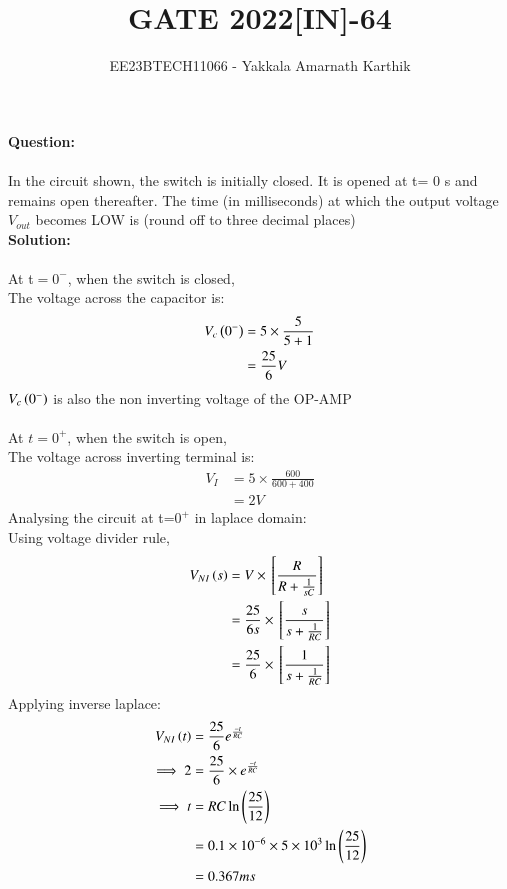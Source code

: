 \documentclass[journal,12pt,twocolumn]{IEEEtran}
\begin{document}


\title{GATE 2022[IN]-64}
\author{EE23BTECH11066 - Yakkala Amarnath Karthik}
\maketitle


\textbf{Question:}\\ \\
In the circuit shown, the switch is initially closed. It is opened at t= 0 s and
remains open thereafter. The time (in milliseconds) at which the output voltage
$V_{out}$ becomes LOW is  (round off to three decimal places)\\


\textbf{Solution:}\\ \\
At t$=0^-$, when the switch is closed,\\
The voltage across the capacitor is:
\begin{align}
V_c\left(0^-\right)&=5\times\frac{5}{5+1}\\
&=\frac{25}{6}V
\end{align}
$V_c\left(0^-\right)$ is also the non inverting voltage of the OP-AMP\\ \\
At $t=0^+$, when the switch is open,\\
The voltage across inverting terminal is:
\begin{align}
V_I&=5\times\frac{600}{600+400}\\
&=2V
\end{align}
Analysing the circuit at t=$0^+$ in laplace domain:\\ 

Using voltage divider rule,
\begin{align}
V_{NI}\left(s\right)&=V\times{}\left[\frac{R}{R+\frac{1}{sC}}\right]\\
    &=\frac{25}{6s}\times{}\left[\frac{s}{s+\frac{1}{RC}}\right]\\
    &=\frac{25}{6}\times{}\left[\frac{1}{s+\frac{1}{RC}}\right]
\end{align}
Applying inverse laplace:
\begin{align}
    V_{NI}\left(t\right)&=\frac{25}{6} e^{\frac{-t}{RC}}\\
    \implies  2&=\frac{25}{6}\times e^{\frac{-t}{RC}}\\
  \implies  t&=RC\ln\left(\frac{25}{12}\right)\\
    &=0.1\times10^{-6}\times5\times10^{3}\ln{\ensuremath{\left(\frac{25}{12}\right)}}\\
    &=0.367ms
\end{align}
\end{document}
